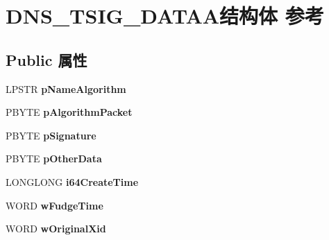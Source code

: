 \hypertarget{struct_d_n_s___t_s_i_g___d_a_t_a_a}{}\section{D\+N\+S\+\_\+\+T\+S\+I\+G\+\_\+\+D\+A\+T\+A\+A结构体 参考}
\label{struct_d_n_s___t_s_i_g___d_a_t_a_a}
\subsection*{Public 属性}
\begin{DoxyCompactItemize}
\item 
\mbox{\label{struct_d_n_s___t_s_i_g___d_a_t_a_a_a764368bff2cc5ff6c34a3ec5403c2d12}} 
L\+P\+S\+TR {\bfseries p\+Name\+Algorithm}
\item 
\mbox{\label{struct_d_n_s___t_s_i_g___d_a_t_a_a_a891d213faa947840d15b6403f7b845af}} 
P\+B\+Y\+TE {\bfseries p\+Algorithm\+Packet}
\item 
\mbox{\label{struct_d_n_s___t_s_i_g___d_a_t_a_a_a13628adb9db5c0811ca0cc0897eba978}} 
P\+B\+Y\+TE {\bfseries p\+Signature}
\item 
\mbox{\label{struct_d_n_s___t_s_i_g___d_a_t_a_a_a59e436fa3a53ce3ddc329bf99f566477}} 
P\+B\+Y\+TE {\bfseries p\+Other\+Data}
\item 
\mbox{\label{struct_d_n_s___t_s_i_g___d_a_t_a_a_a01c3142e56b81f002d12543e8bb5ea75}} 
L\+O\+N\+G\+L\+O\+NG {\bfseries i64\+Create\+Time}
\item 
\mbox{\label{struct_d_n_s___t_s_i_g___d_a_t_a_a_a193e2a13f7e0fe2e13b13676f251fb11}} 
W\+O\+RD {\bfseries w\+Fudge\+Time}
\item 
\mbox{\label{struct_d_n_s___t_s_i_g___d_a_t_a_a_a84fbd205f7b38122e995556978a977ff}} 
W\+O\+RD {\bfseries w\+Original\+Xid}
\item 
\mbox{\label{struct_d_n_s___t_s_i_g___d_a_t_a_a_ac2056402246b2cd5b95aae8a7358adf1}} 

\end{DoxyCompactItemize}
